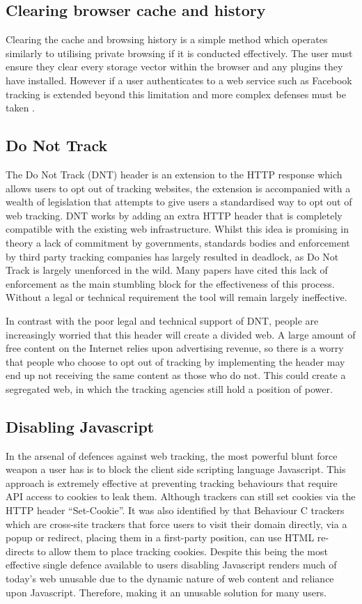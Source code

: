 \documentclass[12pt]{article}
\begin{document}
\subsection{Clearing browser cache and history}
Clearing the cache and browsing history is a simple method which operates similarly to utilising private browsing if it is conducted effectively. The user must ensure they clear every storage vector within the browser and any plugins they have installed. However if a user authenticates to a web service such as Facebook tracking is extended beyond this limitation and more complex defenses must be taken \parencite{bujlow2015web}. 

\subsection{Do Not Track}
The Do Not Track (DNT) header is an extension to the HTTP response which allows users to opt out of tracking websites, the extension is accompanied with a wealth of legislation that attempts to give users a standardised way to opt out of web tracking. DNT works by adding an extra HTTP header that is completely compatible with the existing web infrastructure. Whilst this idea is promising in theory a lack of commitment by governments, standards bodies and enforcement by third party tracking companies has largely resulted in deadlock, as Do Not Track is largely unenforced in the wild. Many papers have cited this lack of enforcement as the main stumbling block for the effectiveness of this process. Without a legal or technical requirement the tool will remain largely ineffective. \newline

In contrast with the poor legal and technical support of DNT, people are increasingly worried that this header will create a divided web. A large amount of free content on the Internet relies upon advertising revenue, so there is a worry that people who choose to opt out of tracking by implementing the header may end up not receiving the same content as those who do not. This could create a segregated web, in which the tracking agencies still hold a position of power. 

\subsection{Disabling Javascript}
In the arsenal of defences against web tracking, the most powerful blunt force weapon a user has is to block the client side scripting language Javascript. This approach is extremely effective at preventing tracking behaviours that require API access to cookies to leak them. Although trackers can still set cookies via the HTTP header  ``Set-Cookie''. It was also identified by \parencite{roesner} that Behaviour C trackers which are cross-site trackers that force users to visit their domain directly, via a popup or redirect, placing them in a first-party position, can use HTML re-directs to allow them to place tracking cookies. Despite this being the most effective single defence available to users disabling Javascript renders much of today's web unusable due to the dynamic nature of web content and reliance upon Javascript. Therefore, making it an unusable solution for many users. 
\end{document}
